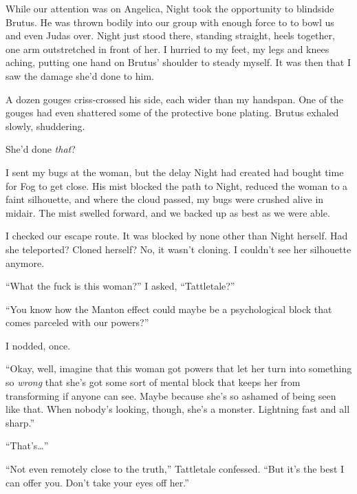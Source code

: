 While our attention was on Angelica, Night took the opportunity to blindside Brutus.  He was thrown bodily into our group with enough force to to bowl us and even Judas over.  Night just stood there, standing straight, heels together, one arm outstretched in front of her.  I hurried to my feet, my legs and knees aching, putting one hand on Brutus' shoulder to steady myself.  It was then that I saw the damage she'd done to him.



A dozen gouges criss-crossed his side, each wider than my handspan.  One of the gouges had even shattered some of the protective bone plating.  Brutus exhaled slowly, shuddering.



She'd done \emph{that}?



I sent my bugs at the woman, but the delay Night had created had bought time for Fog to get close.  His mist blocked the path to Night, reduced the woman to a faint silhouette, and where the cloud passed, my bugs were crushed alive in midair.  The mist swelled forward, and we backed up as best as we were able.



I checked our escape route.  It was blocked by none other than Night herself.  Had she teleported?  Cloned herself?  No, it wasn't cloning.  I couldn't see her silhouette anymore.



``What the fuck is this woman?'' I asked, ``Tattletale?''



``You know how the Manton effect could maybe be a psychological block that comes parceled with our powers?''



I nodded, once.



``Okay, well, imagine that this woman got powers that let her turn into something so \emph{wrong} that she's got some sort of mental block that keeps her from transforming if anyone can see.  Maybe because she's so ashamed of being seen like that.  When nobody's looking, though, she's a monster.  Lightning fast and all sharp.''



``That's\ldots''



``Not even remotely close to the truth,'' Tattletale confessed.  ``But it's the best I can offer you.  Don't take your eyes off her.''



